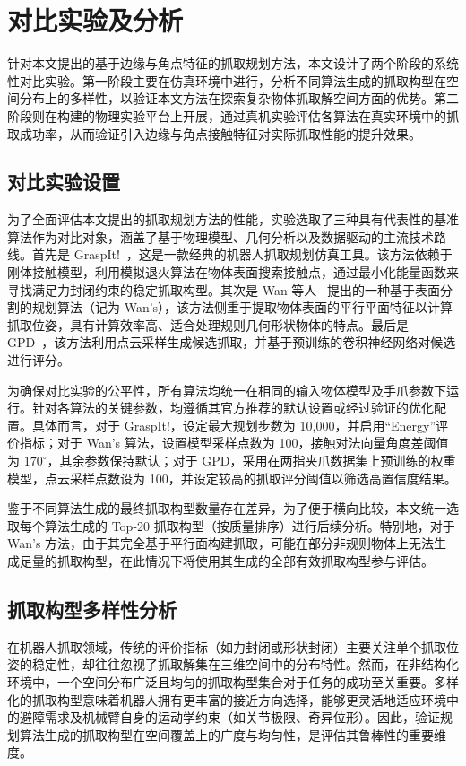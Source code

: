 \section{对比实验及分析}
\label{sec:experiments}
针对本文提出的基于边缘与角点特征的抓取规划方法，本文设计了两个阶段的系统性对比实验。第一阶段主要在仿真环境中进行，分析不同算法生成的抓取构型在空间分布上的多样性，以验证本文方法在探索复杂物体抓取解空间方面的优势。第二阶段则在构建的物理实验平台上开展，通过真机实验评估各算法在真实环境中的抓取成功率，从而验证引入边缘与角点接触特征对实际抓取性能的提升效果。

\subsection{对比实验设置}
为了全面评估本文提出的抓取规划方法的性能，实验选取了三种具有代表性的基准算法作为对比对象，涵盖了基于物理模型、几何分析以及数据驱动的主流技术路线。首先是 GraspIt!~\cite{miller_graspit_2021}，这是一款经典的机器人抓取规划仿真工具。该方法依赖于刚体接触模型，利用模拟退火算法在物体表面搜索接触点，通过最小化能量函数来寻找满足力封闭约束的稳定抓取构型。其次是 Wan 等人~\cite{wan_planning_2021} 提出的一种基于表面分割的规划算法（记为 Wan's），该方法侧重于提取物体表面的平行平面特征以计算抓取位姿，具有计算效率高、适合处理规则几何形状物体的特点。最后是 GPD~\cite{tenpas_grasp_2017}，该方法利用点云采样生成候选抓取，并基于预训练的卷积神经网络对候选进行评分。

为确保对比实验的公平性，所有算法均统一在相同的输入物体模型及手爪参数下运行。针对各算法的关键参数，均遵循其官方推荐的默认设置或经过验证的优化配置。具体而言，对于 GraspIt!，设定最大规划步数为 10,000，并启用“Energy”评价指标；对于 Wan's 算法，设置模型采样点数为 100，接触对法向量角度差阈值为 $170^\circ$，其余参数保持默认；对于 GPD，采用在两指夹爪数据集上预训练的权重模型，点云采样点数设为 100，并设定较高的抓取评分阈值以筛选高置信度结果。

鉴于不同算法生成的最终抓取构型数量存在差异，为了便于横向比较，本文统一选取每个算法生成的 Top-20 抓取构型（按质量排序）进行后续分析。特别地，对于 Wan's 方法，由于其完全基于平行面构建抓取，可能在部分非规则物体上无法生成足量的抓取构型，在此情况下将使用其生成的全部有效抓取构型参与评估。


\subsection{抓取构型多样性分析}

在机器人抓取领域，传统的评价指标（如力封闭或形状封闭）主要关注单个抓取位姿的稳定性，却往往忽视了抓取解集在三维空间中的分布特性。然而，在非结构化环境中，一个空间分布广泛且均匀的抓取构型集合对于任务的成功至关重要。多样化的抓取构型意味着机器人拥有更丰富的接近方向选择，能够更灵活地适应环境中的避障需求及机械臂自身的运动学约束（如关节极限、奇异位形）。因此，验证规划算法生成的抓取构型在空间覆盖上的广度与均匀性，是评估其鲁棒性的重要维度。

